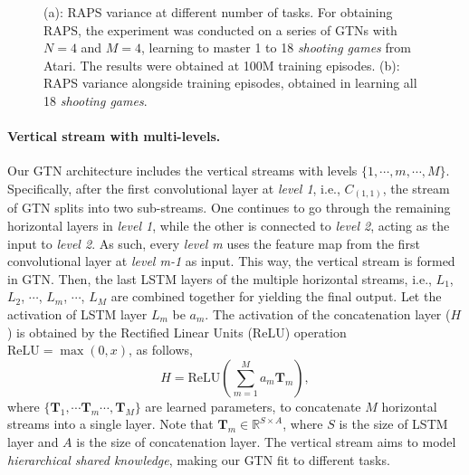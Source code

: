 \documentclass[letterpaper]{article} %
\begin{document}
\begin{figure}[htb]
  \centering
  \caption{
    (a): RAPS variance at different number of tasks.
    For obtaining RAPS, the experiment was conducted on a series of GTNs with $N=4$ and $M=4$, learning to master 1 to 18 \textit{shooting games} from Atari. The results were obtained at 100M training episodes.
    (b): RAPS variance alongside training episodes, obtained in learning all 18 \textit{shooting games}.
  }
\end{figure}
\paragraph{Vertical stream with multi-levels.}
Our GTN architecture includes the vertical streams with levels $\{1, \cdots, m, \cdots, M\}$.
Specifically, after the first convolutional layer at \textit{level 1}, i.e., $C_{(1,1)}$, the stream of GTN splits into two sub-streams.
One continues to go through the remaining horizontal layers in \textit{level 1}, while the other is connected to \textit{level 2}, acting as the input to \textit{level 2}.
As such, every \textit{level  m} uses the feature map from the first convolutional layer at \textit{level m-1} as input.
This way, the vertical stream is formed in GTN.
Then, the last LSTM layers of the multiple horizontal streams, i.e.,  $L_1$, $L_2$, $\cdots$, $L_m$, $\cdots$, $L_M$ are combined together for yielding the final output.
Let the activation of LSTM layer $L_m$ be $a_m$.
The activation of the concatenation layer ($H$) is obtained by the Rectified Linear Units (\textrm{ReLU}) operation $\textrm{ReLU}=\max(0,x)$, as follows,
\begin{equation}
\label{combine}
H=\textrm{ReLU}(\sum^{M}_{m=1}a_{m}\textbf{T}_{m}),
\end{equation}
where $\{ \textbf{T}_1, \cdots \textbf{T}_m \cdots, \textbf{T}_M\}$ are learned parameters, to concatenate $M$ horizontal streams into a single layer.
Note that $\textbf{T}_{m}\in\mathbb{R}^{S \times A}$, where $S$ is the size of LSTM layer and $A$ is the size of concatenation layer.
The vertical stream aims to model \textit{hierarchical shared knowledge}, making our GTN fit to different tasks.
\end{document}
